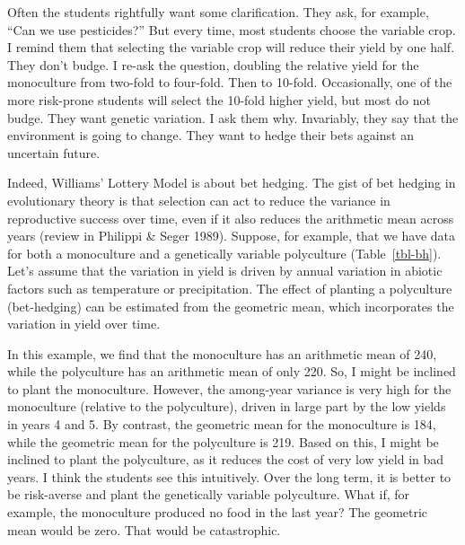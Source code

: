 \documentclass[
  letterpaper,
]{book}
\begin{document}
Often the students rightfully want some clarification. They ask, for
example, ``Can we use pesticides?'' But every time, most students choose
the variable crop. I remind them that selecting the variable crop will
reduce their yield by one half. They don't budge. I re-ask the question,
doubling the relative yield for the monoculture from two-fold to
four-fold. Then to 10-fold. Occasionally, one of the more risk-prone
students will select the 10-fold higher yield, but most do not budge.
They want genetic variation. I ask them why. Invariably, they say that
the environment is going to change. They want to hedge their bets
against an uncertain future.

Indeed, Williams' Lottery Model is about bet hedging. The gist of bet
hedging in evolutionary theory is that selection can act to reduce the
variance in reproductive success over time, even if it also reduces the
arithmetic mean across years (review in Philippi \& Seger 1989).
Suppose, for example, that we have data for both a monoculture and a
genetically variable polyculture (Table~\ref{tbl-bh}). Let's assume that
the variation in yield is driven by annual variation in abiotic factors
such as temperature or precipitation. The effect of planting a
polyculture (bet-hedging) can be estimated from the geometric mean,
which incorporates the variation in yield over time.

In this example, we find that the monoculture has an arithmetic mean of
240, while the polyculture has an arithmetic mean of only 220. So, I
might be inclined to plant the monoculture. However, the among-year
variance is very high for the monoculture (relative to the polyculture),
driven in large part by the low yields in years 4 and 5. By contrast,
the geometric mean for the monoculture is 184, while the geometric mean
for the polyculture is 219. Based on this, I might be inclined to plant
the polyculture, as it reduces the cost of very low yield in bad years.
I think the students see this intuitively. Over the long term, it is
better to be risk-averse and plant the genetically variable polyculture.
What if, for example, the monoculture produced no food in the last year?
The geometric mean would be zero. That would be catastrophic.
\end{document}
